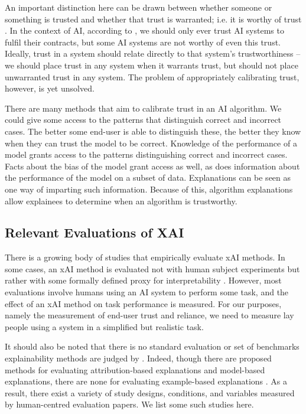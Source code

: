 An important distinction here can be drawn between whether someone or something is trusted and whether that trust is warranted; i.e. it is worthy of trust \cite{hardin_trust_2002}. In the context of AI, according to \textcite{jacovi_formalizing_2021}, we should only ever trust AI systems to fulfil their contracts, but some AI systems are not worthy of even this trust. Ideally, trust in a system should relate directly to that system's trustworthiness – we should place trust in any system when it warrants trust, but should not place unwarranted trust in any system. The problem of appropriately calibrating trust, however, is yet unsolved.

There are many methods that aim to calibrate trust in an AI algorithm. We could give some access to the patterns that distinguish correct and incorrect cases. The better some end-user is able to distinguish these, the better they know when they can trust the model to be correct. Knowledge of the performance of a model grants access to the patterns distinguishing correct and incorrect cases. Facts about the bias of the model grant access as well, as does information about the performance of the model on a subset of data. Explanations can be seen as one way of imparting such information. Because of this, algorithm explanations allow explainees to determine when an algorithm is trustworthy. 

\subsection{Relevant Evaluations of XAI}
There is a growing body of studies that empirically evaluate xAI methods. In some cases, an xAI method is evaluated not with human subject experiments but rather with some formally defined proxy for interpretability \cite{doshi-velez_towards_2017}. However, most evaluations involve humans using an AI system to perform some task, and the effect of an xAI method on task performance is measured.  For our purposes, namely the measurement of end-user trust and reliance, we need to measure lay people using a system in a simplified but realistic task.

It should also be noted that there is no standard evaluation or set of benchmarks explainability methods are judged by \cite{doshi-velez_towards_2017}. Indeed, though there are proposed methods for evaluating attribution-based explanations and model-based explanations, there are none for evaluating example-based explanations \cite{markus_role_2021}. As a result, there exist a variety of study designs, conditions, and variables measured by human-centred evaluation papers. We list some such studies here.

